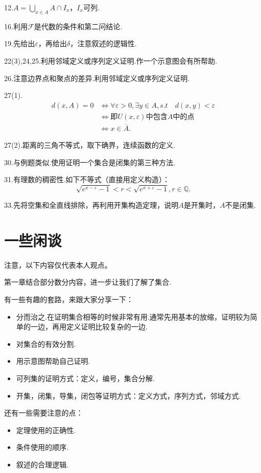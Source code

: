 \documentclass[bwprint, withoutpreface]{cumcmthesis}
\begin{document}
12.$A = \bigcup_{x \in A}{A \cap I_x}$，$I_x$可列.

16.利用$\mathcal{F}$是代数的条件和第二问结论.

19.先给出$\varepsilon$，再给出$\delta$，注意叙述的逻辑性.

22(3),24,25.利用邻域定义或序列定义证明.作一个示意图会有所帮助.

26.注意边界点和聚点的差异.利用邻域定义或序列定义证明.

27(1).
\begin{align*}
	d(x, A) = 0 & \iff \forall \varepsilon > 0, \exists y \in A, s.t \quad d(x, y) < \varepsilon \\
				& \iff \mbox{即$U(x, \varepsilon)$中包含$A$中的点} \\
				& \iff x \in \overline{A}.
\end{align*}

27(2).距离的三角不等式，取下确界，连续函数的定义.

30.与例题类似.使用证明一个集合是闭集的第三种方法.

31.有理数的稠密性.如下不等式（直接用定义构造）：
\begin{equation*}
	\sqrt{e^{x - \varepsilon} - 1} < r < \sqrt{e^{x + \varepsilon} - 1}, r \in \mathbb{Q}.
\end{equation*}

33.先将空集和全直线排除，再利用开集构造定理，说明$A$是开集时，$A$不是闭集.

\section{一些闲谈}
\indent 注意，以下内容仅代表本人观点。

第一章结合部分数分内容，进一步让我们了解了集合.

有一些有趣的套路，来跟大家分享一下：
\begin{itemize}[itemindent=2em]
	\item 分而治之.在证明集合相等的时候非常有用.通常先用基本的放缩，证明较为简单的一边，再用定义证明比较复杂的一边.
	\item 对集合的有效分割.
	\item 用示意图帮助自己证明.
	\item 可列集的证明方式：定义，编号，集合分解.
	\item 开集，闭集，导集，闭包等证明方式：定义方式，序列方式，邻域方式.
\end{itemize}

还有一些需要注意的点：
\begin{itemize}[itemindent=2em]
	\item 定理使用的正确性.
	\item 条件使用的顺序.
	\item 叙述的合理逻辑.
\end{itemize}
\end{document}
